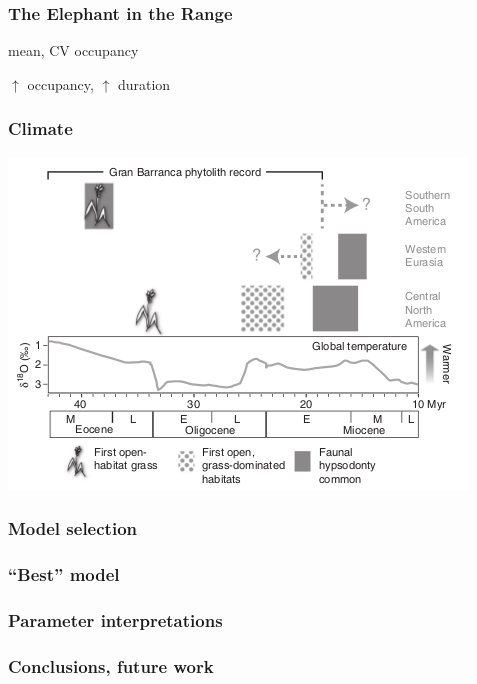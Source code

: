 \documentclass{beamer}
\begin{document}
\begin{frame}
  \frametitle{The Elephant in the Range}


  mean, CV occupancy

  \(\uparrow\) occupancy, \(\uparrow\) duration

\end{frame}

\begin{frame}
  \frametitle{Climate}

  \includegraphics[height=0.8\textheight,width=\textwidth,keepaspectratio=true]{figure/stromberg}

  \tiny{}
\end{frame}


\begin{frame}
  \frametitle{Model selection}

\end{frame}

\begin{frame}
  \frametitle{``Best'' model}

\end{frame}

\begin{frame}
  \frametitle{Parameter interpretations}

\end{frame}

\begin{frame}
  \frametitle{Conclusions, future work}

\end{frame}
\end{document}
